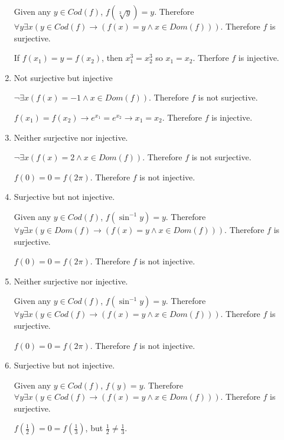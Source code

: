 \documentclass[12pt,letterpaper]{article}
\newcommand{\lif}{\rightarrow}
\begin{document}
\begin{enumerate}
{Given any $y \in Cod(f)$, $f(\sqrt[3]{y}) = y$. Therefore $\forall y \exists x (y \in Cod(f) \lif (f(x) = y \land x \in Dom (f)))$. Therefore $f$ is surjective.

If $f(x_1) = y = f(x_2)$, then $x_1^3 = x_2^3 $ so $x_1 = x_2$. Therfore $f$ is injective.
}

\item {Not surjective but injective

$\neg \exists x (f(x) = -1 \land x \in Dom(f))$. Therefore $f$ is not surjective.

$f(x_1) = f(x_2) \lif e^{x_1} = e^{x_2} \lif x_1 = x_2$. Therefore $f$ is injective.
}

\item {Neither surjective nor injective.

$\neg \exists x (f(x) = 2 \land x \in Dom(f))$. Therefore $f$ is not surjective.


$ f(0) = 0 = f(2 \pi) $. Therefore $f$ is not injective.
}

\item {Surjective but not injective.

Given any $y \in Cod(f)$, $f(\sin^{-1} y) = y$. Therefore $\forall y \exists x (y \in Dom(f) \lif (f(x) = y \land x \in Dom(f)))$. Therefore $f$ is surjective.

$ f(0) = 0 = f(2 \pi) $. Therefore $f$ is not injective.
}

\item {Neither surjective nor injective.

Given any $y \in Cod(f)$, $f(\sin^{-1} y) = y$. Therefore $\forall y \exists x (y \in Cod(f) \lif (f(x) = y \land x \in Dom(f)))$. Therefore $f$ is surjective.

$ f(0) = 0 = f(2 \pi) $. Therefore $f$ is not injective.
}

\item {Surjective but not injective.

Given any $y \in Cod(f)$, $f(y) = y$. Therefore $\forall y \exists x (y \in Cod(f) \lif (f(x) = y \land x \in Dom(f)))$. Therefore $f$ is surjective.

$f(\frac{1}{2}) = 0 = f(\frac{1}{3})$, but $\frac{1}{2} \neq \frac{1}{3}$.
}

\end{enumerate}
\end{document}
